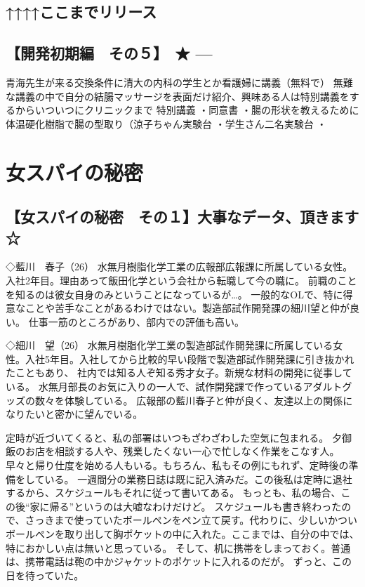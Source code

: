\section{↑↑↑↑ここまでリリース}
\section{【開発初期編　その５】　★ ---}



青海先生が来る交換条件に清大の内科の学生とか看護婦に講義（無料で）
無難な講義の中で自分の結腸マッサージを表面だけ紹介、興味ある人は特別講義をするからいついつにクリニックまで
特別講義
・同意書
・腸の形状を教えるために体温硬化樹脂で腸の型取り（涼子ちゃん実験台
・学生さん二名実験台
・


\chapter{女スパイの秘密}
\section{【女スパイの秘密　その１】大事なデータ、頂きます　☆}

◇藍川　春子（26）
水無月樹脂化学工業の広報部広報課に所属している女性。入社2年目。理由あって飯田化学という会社から転職して今の職に。
前職のことを知るのは彼女自身のみということになっているが…。
一般的なOLで、特に得意なことや苦手なことがあるわけではない。製造部試作開発課の細川望と仲が良い。
仕事一筋のところがあり、部内での評価も高い。


◇細川　望（26）
水無月樹脂化学工業の製造部試作開発課に所属している女性。入社5年目。入社してから比較的早い段階で製造部試作開発課に引き抜かれたこともあり、
社内では知る人ぞ知る秀才女子。新規な材料の開発に従事している。
水無月部長のお気に入りの一人で、試作開発課で作っているアダルトグッズの数々を体験している。
広報部の藍川春子と仲が良く、友達以上の関係になりたいと密かに望んでいる。



定時が近づいてくると、私の部署はいつもざわざわした空気に包まれる。
夕御飯のお店を相談する人や、残業したくない一心で忙しなく作業をこなす人。
早々と帰り仕度を始める人もいる。もちろん、私もその例にもれず、定時後の準備をしている。
一週間分の業務日誌は既に記入済みだ。この後私は定時に退社するから、スケジュールもそれに従って書いてある。
もっとも、私の場合、この後“家に帰る”というのは大嘘なわけだけど。
スケジュールも書き終わったので、さっきまで使っていたボールペンをペン立て戻す。代わりに、少しいかついボールペンを取り出して胸ポケットの中に入れた。ここまでは、自分の中では、特におかしい点は無いと思っている。
そして、机に携帯をしまっておく。普通は、携帯電話は鞄の中かジャケットのポケットに入れるのだが。
ずっと、この日を待っていた。

